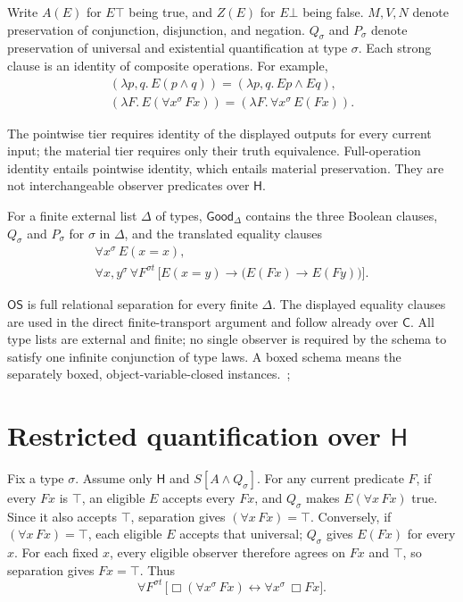 \documentclass[12pt,letterpaper]{article}
\newcommand{\Hlogic}{\mathsf{H}}
\newcommand{\C}{\mathsf{C}}
\newcommand{\OS}{\mathsf{OS}}
\newcommand{\Good}{\mathsf{Good}}
\begin{document}
Write $A(E)$ for $E\top$ being true, and $Z(E)$ for $E\bot$ being false. $M,V,N$ denote preservation of conjunction, disjunction, and negation. $Q_\sigma$ and $P_\sigma$ denote preservation of universal and existential quantification at type $\sigma$. Each strong clause is an identity of composite operations. For example,
\begin{gather*}
(\lambda p,q.\,E(p\land q))=(\lambda p,q.\,Ep\land Eq),\\
(\lambda F.\,E(\forall x^\sigma\,Fx))=(\lambda F.\,\forall x^\sigma\,E(Fx)).
\end{gather*}

The pointwise tier requires identity of the displayed outputs for every current input; the material tier requires only their truth equivalence. Full-operation identity entails pointwise identity, which entails material preservation. They are not interchangeable observer predicates over $\Hlogic$.


For a finite external list $\Delta$ of types, $\Good_\Delta$ contains the three Boolean clauses, $Q_\sigma$ and $P_\sigma$ for $\sigma$ in $\Delta$, and the translated equality clauses
\begin{gather*}
\forall x^\sigma\,E(x=x),\\
\forall x,y^\sigma\,\forall F^{\sigma t}\,\bigl[E(x=y)\to\bigl(E(Fx)\to E(Fy)\bigr)\bigr].
\end{gather*}

$\OS$ is full relational separation for every finite $\Delta$. The displayed equality clauses are used in the direct finite-transport argument and follow already over $\C$. All type lists are external and finite; no single observer is required by the schema to satisfy one infinite conjunction of type laws. A boxed schema means the separately boxed, object-variable-closed instances.~\cite{r6};~\cite[\S1]{r9}


\section{Restricted quantification over \texorpdfstring{$\Hlogic$}{H}}

Fix a type $\sigma$. Assume only $\Hlogic$ and $S[A\land Q_\sigma]$. For any current predicate $F$, if every $Fx$ is $\top$, an eligible $E$ accepts every $Fx$, and $Q_\sigma$ makes $E(\forall x\,Fx)$ true. Since it also accepts $\top$, separation gives $(\forall x\,Fx)=\top$. Conversely, if $(\forall x\,Fx)=\top$, each eligible $E$ accepts that universal; $Q_\sigma$ gives $E(Fx)$ for every $x$. For each fixed $x$, every eligible observer therefore agrees on $Fx$ and $\top$, so separation gives $Fx=\top$. Thus
\[
\forall F^{\sigma t}\,\bigl[\Box(\forall x^\sigma\,Fx)\leftrightarrow\forall x^\sigma\,\Box Fx\bigr].
\]
\end{document}
